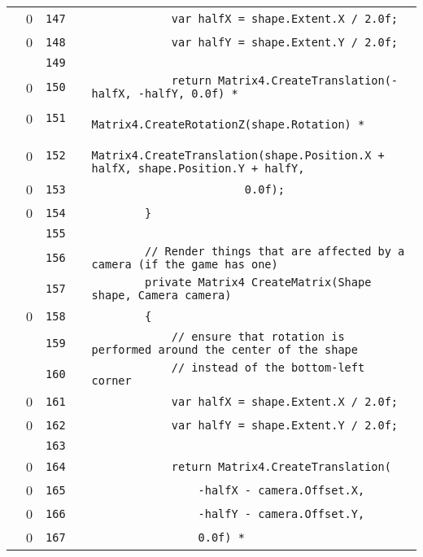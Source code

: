\documentclass[a4paper,landscape,10pt]{article}
\begin{document}
\begin{longtable}[l]{lrrll}
\cellcolor{red} & 0 & \verb~147~ & & \verb~            var halfX = shape.Extent.X / 2.0f;~\\
\cellcolor{red} & 0 & \verb~148~ & & \verb~            var halfY = shape.Extent.Y / 2.0f;~\\
\cellcolor{gray} &  & \verb~149~ & & \verb~~\\
\cellcolor{red} & 0 & \verb~150~ & & \verb~            return Matrix4.CreateTranslation(-halfX, -halfY, 0.0f) *~\\
\cellcolor{red} & 0 & \verb~151~ & & \verb~                   Matrix4.CreateRotationZ(shape.Rotation) *~\\
\cellcolor{red} & 0 & \verb~152~ & & \verb~                   Matrix4.CreateTranslation(shape.Position.X + halfX, shape.Position.Y + halfY,~\\
\cellcolor{red} & 0 & \verb~153~ & & \verb~                       0.0f);~\\
\cellcolor{red} & 0 & \verb~154~ & & \verb~        }~\\
\cellcolor{gray} &  & \verb~155~ & & \verb~~\\
\cellcolor{gray} &  & \verb~156~ & & \verb~        // Render things that are affected by a camera (if the game has one)~\\
\cellcolor{gray} &  & \verb~157~ & & \verb~        private Matrix4 CreateMatrix(Shape shape, Camera camera)~\\
\cellcolor{red} & 0 & \verb~158~ & & \verb~        {~\\
\cellcolor{gray} &  & \verb~159~ & & \verb~            // ensure that rotation is performed around the center of the shape~\\
\cellcolor{gray} &  & \verb~160~ & & \verb~            // instead of the bottom-left corner~\\
\cellcolor{red} & 0 & \verb~161~ & & \verb~            var halfX = shape.Extent.X / 2.0f;~\\
\cellcolor{red} & 0 & \verb~162~ & & \verb~            var halfY = shape.Extent.Y / 2.0f;~\\
\cellcolor{gray} &  & \verb~163~ & & \verb~~\\
\cellcolor{red} & 0 & \verb~164~ & & \verb~            return Matrix4.CreateTranslation(~\\
\cellcolor{red} & 0 & \verb~165~ & & \verb~                -halfX - camera.Offset.X,~\\
\cellcolor{red} & 0 & \verb~166~ & & \verb~                -halfY - camera.Offset.Y,~\\
\cellcolor{red} & 0 & \verb~167~ & & \verb~                0.0f) *~\\

\end{longtable}
\end{document}
